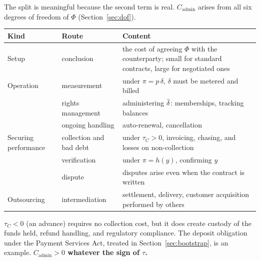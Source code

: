 The split is meaningful because the second term is real.
$C_{\mathrm{admin}}$ arises from all six degrees of freedom of $\Phi$
(Section~\ref{sec:dof}).

\begin{center}
\begin{tabularx}{\textwidth}{@{}llX@{}}
\toprule
Kind & Route & Content \\
\midrule
Setup & conclusion & the cost of agreeing $\Phi$ with the counterparty; small for standard contracts, large for negotiated ones \\
Operation & measurement & under $\pi=p\,\delta$, $\delta$ must be metered and billed \\
 & rights management & administering $\dbar$: memberships, tracking balances \\
 & ongoing handling & auto-renewal, cancellation \\
Securing performance & collection and bad debt & under $\tau_C>0$, invoicing, chasing, and losses on non-collection \\
 & verification & under $\pi=h(y)$, confirming $y$ \\
 & dispute & disputes arise even when the contract is written \\
Outsourcing & intermediation & settlement, delivery, customer acquisition performed by others \\
\bottomrule
\end{tabularx}
\label{tab:cadmin-routes}
\end{center}

\begin{remark}
$\tau_C<0$ (an advance) requires no collection cost, but it does create custody of the
funds held, refund handling, and regulatory compliance. The deposit obligation under the
Payment Services Act, treated in Section~\ref{sec:bootstrap}, is an example.
\textbf{$C_{\mathrm{admin}}>0$ whatever the sign of $\tau$.}
\end{remark}

